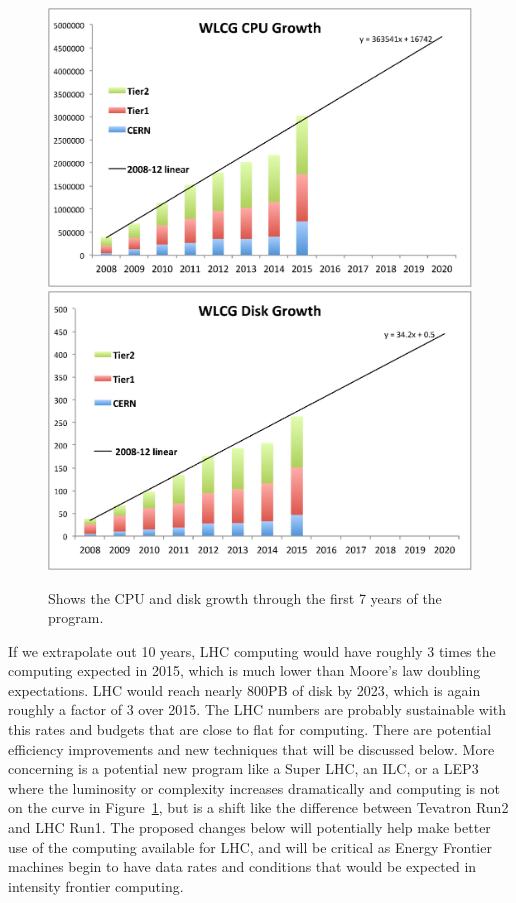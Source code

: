 \begin{figure}[htb]
\begin{center}
\includegraphics[width=0.45\hsize]{Computing/Growth1.eps}
\includegraphics[width=0.45\hsize]{Computing/Growth2.eps}
\caption{Shows the CPU and disk growth through the first 7 years of the program.}
\label{fig:growth}
\end{center}
\end{figure}



If we extrapolate out 10 years, LHC computing would have roughly 3 times the computing expected in 2015, 
which is much lower than Moore's law doubling expectations.    LHC would reach nearly 800PB of disk by 2023, 
which is again roughly a factor of 3 over 2015.    The LHC numbers are probably sustainable with this rates 
and budgets that are close to flat for computing.   There are potential efficiency improvements and new 
techniques that will be discussed below.    More concerning is a potential new program like a Super LHC, an ILC, or a 
LEP3 where the luminosity or complexity increases dramatically and computing is not on the curve in Figure~\ref{fig:growth},
 but is a shift like the difference between Tevatron Run2 and LHC Run1.    The proposed changes below will 
potentially help make better use of the computing available for LHC, and will be critical as Energy 
Frontier machines begin to have data rates and conditions that would be expected in intensity frontier computing.


